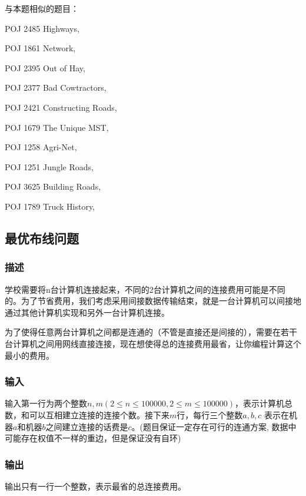 与本题相似的题目：
\begindot
\item POJ 2485 Highways, 
\item POJ 1861 Network, 
\item POJ 2395 Out of Hay, 
\item POJ 2377 Bad Cowtractors, 
\item POJ 2421 Constructing Roads, 
\item POJ 1679 The Unique MST, 
\item POJ 1258 Agri-Net, 
\item POJ 1251 Jungle Roads, 
\item POJ 3625 Building Roads, 
\item POJ 1789 Truck History, 
\myenddot


\subsection{最优布线问题 }
\subsubsection{描述}
学校需要将n台计算机连接起来，不同的2台计算机之间的连接费用可能是不同的。为了节省费用，我们考虑采用间接数据传输结束，就是一台计算机可以间接地通过其他计算机实现和另外一台计算机连接。

为了使得任意两台计算机之间都是连通的（不管是直接还是间接的），需要在若干台计算机之间用网线直接连接，现在想使得总的连接费用最省，让你编程计算这个最小的费用。

\subsubsection{输入}
输入第一行为两个整数$n,m(2 \leq n \leq 100000,2\leq m \leq 100000)$，表示计算机总数，和可以互相建立连接的连接个数。接下来$m$行，每行三个整数$a,b,c$ 表示在机器$a$和机器$b$之间建立连接的话费是$c$。(题目保证一定存在可行的连通方案, 数据中可能存在权值不一样的重边，但是保证没有自环)

\subsubsection{输出}
输出只有一行一个整数，表示最省的总连接费用。

